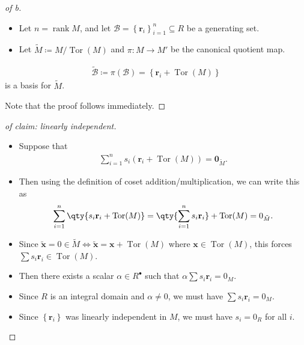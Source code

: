 \begin{proof}[of b]

\envlist

\begin{itemize}
\tightlist
\item
  Let \(n = \operatorname{rank}M\), and let
  \(\mathcal B = \left\{{\mathbf{r}_i}\right\}_{i=1}^n \subseteq R\) be
  a generating set.
\item
  Let \(\tilde M \coloneqq M/\operatorname{Tor}(M)\) and
  \(\pi: M \to M'\) be the canonical quotient map.
\end{itemize}

\begin{claim}

\begin{align*}
\tilde {\mathcal{B}}\coloneqq\pi(\mathcal B) = \left\{{\mathbf{r}_i + \operatorname{Tor}(M)}\right\}
\end{align*}
is a basis for \(\tilde M\).

\end{claim}

Note that the proof follows immediately.

\end{proof}

\begin{proof}[of claim: linearly independent]

\envlist

\begin{itemize}
\item
  Suppose that
  \begin{align*}
  \sum_{i=1}^n s_i (\mathbf{r}_i + \operatorname{Tor}(M)) = \mathbf{0}_{\tilde M}
  .\end{align*}
\item
  Then using the definition of coset addition/multiplication, we can
  write this as
  \begin{align*}  
  \sum_{i=1}^n \qty { s_i \mathbf{r}_i + \operatorname{Tor}(M)} = 
  \qty{ \sum_{i=1}^n  s_i \mathbf{r}_i} + \operatorname{Tor}(M)  = 0_{\tilde M}
  .\end{align*}
\item
  Since
  \(\tilde{\mathbf{x}} = 0 \in \tilde M \iff \tilde{\mathbf{x}} = \mathbf{x} + \operatorname{Tor}(M)\)
  where \(\mathbf{x} \in \operatorname{Tor}(M)\), this forces
  \(\sum s_i \mathbf{r}_i \in \operatorname{Tor}(M)\).
\item
  Then there exists a scalar \(\alpha\in R^{\bullet}\) such that
  \(\alpha \sum s_i \mathbf{r}_i = 0_M\).
\item
  Since \(R\) is an integral domain and \(\alpha \neq 0\), we must have
  \(\sum s_i \mathbf{r}_i = 0_M\).
\item
  Since \(\left\{{\mathbf{r}_i}\right\}\) was linearly independent in
  \(M\), we must have \(s_i = 0_R\) for all \(i\).
\end{itemize}

\end{proof}

